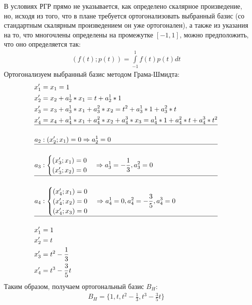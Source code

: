 \documentclass[12pt, a4paper]{article}
\begin{document}
В условиях РГР прямо не указывается, как определено скалярное произведение, но, исходя из того, что в плане требуется ортогонализовать выбранный базис (со стандартным скалярным произведением он уже ортогонален), а также из указания на то, что многочлены определены на промежутке $\left[-1, 1\right]$, можно предположить, что оно определяется так:
\begin{equation*}
\begin{aligned}
(f(t); p(t))=\int\limits_{-1}^1 f(t) p(t) dt
\end{aligned}
\end{equation*}
Ортогонализуем выбранный базис методом Грама-Шмидта:
\begin{equation*}
\begin{aligned}
x_1' &= x_1 = 1\\
x_2' &= x_2 + a_2^1 * x_1 = t + a_2^1 * 1\\
x_3' &= x_3 + a_3^1 * x_1 + a_3^2 * x_2 = t^2 + a_3^1 * 1 + a_3^2 * t\\
x_4' &= x_4 + a_4^1 * x_1 + a_4^2 * x_2 + a_4^3 * x_3 =  a_4^1 * 1 + a_4^2 * t + a_4^3 * t^2\\
\hline\\
a_2 &: (x_2'; x_1) = 0 \Rightarrow a_2^1=0\\
\hline\\
a_3 &: \begin{cases}
(x_3'; x_1) = 0\\
(x_3'; x_2) = 0\\
\end{cases} \Rightarrow a_3^1=-\frac{1}{3}, a_3^2=0\\
\hline\\
a_4 &: \begin{cases}
(x_4'; x_1) = 0\\
(x_4'; x_2) = 0\\
(x_4'; x_3) = 0\\
\end{cases} \Rightarrow  a_4^1=0, a_4^2=-\frac{3}{5}, a_4^3=0\\
\hline\\
x_1'&=1\\
x_2'&=t\\
x_3'&=t^2-\frac{1}{3}\\
x_4'&=t^3-\frac{3}{5}t
\end{aligned}
\end{equation*}
Таким образом, получаем ортогональный базис $B_H$:
\begin{equation*}
\begin{aligned}
B_H = \{1, t, t^2-\frac{1}{3}, t^3-\frac{3}{5}t\}
\end{aligned}
\end{equation*}
\end{document}
